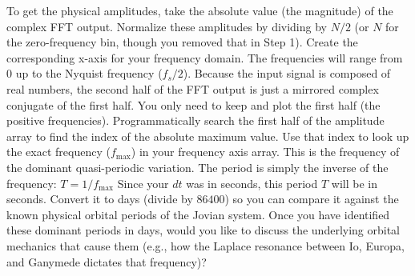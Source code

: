 {}\markdownRendererUlBegin
\markdownRendererUlItem To get the physical amplitudes, take the absolute value (the magnitude) of the complex FFT output.\markdownRendererUlItemEnd 
\markdownRendererUlItem Normalize these amplitudes by dividing by $N/2$ (or $N$ for the zero-frequency bin, though you removed that in Step 1).\markdownRendererUlItemEnd 
\markdownRendererUlEnd \markdownRendererInterblockSeparator
{}
\markdownRendererSectionEnd \markdownRendererSectionBegin
{}\markdownRendererInterblockSeparator
{}Create the corresponding x-axis for your frequency domain.\markdownRendererInterblockSeparator
{}\markdownRendererUlBegin
\markdownRendererUlItem The frequencies will range from $0$ up to the Nyquist frequency ($f_s / 2$).\markdownRendererUlItemEnd 
\markdownRendererUlItem Because the input signal is composed of real numbers, the second half of the FFT output is just a mirrored complex conjugate of the first half. You only need to keep and plot the first half (the positive frequencies).\markdownRendererUlItemEnd 
\markdownRendererUlEnd \markdownRendererInterblockSeparator
{}
\markdownRendererSectionEnd \markdownRendererSectionBegin
{}\markdownRendererInterblockSeparator
{}Programmatically search the first half of the amplitude array to find the index of the absolute maximum value. Use that index to look up the exact frequency ($f_{\text{max}}$) in your frequency axis array. This is the frequency of the dominant quasi-periodic variation.\markdownRendererInterblockSeparator
{}
\markdownRendererSectionEnd \markdownRendererSectionBegin
{}\markdownRendererInterblockSeparator
{}The period is simply the inverse of the frequency:\markdownRendererInterblockSeparator
{}\markdownRendererUlBegin
\markdownRendererUlItem $T = 1 / f_{\text{max}}$\markdownRendererUlItemEnd 
\markdownRendererUlItem Since your $dt$ was in seconds, this period $T$ will be in seconds. Convert it to days (divide by $86400$) so you can compare it against the known physical orbital periods of the Jovian system.\markdownRendererUlItemEnd 
\markdownRendererUlEnd \markdownRendererInterblockSeparator
{}\markdownRendererThematicBreak{}\markdownRendererInterblockSeparator
{}Once you have identified these dominant periods in days, would you like to discuss the underlying orbital mechanics that cause them (e.g., how the Laplace resonance between Io, Europa, and Ganymede dictates that frequency)?\markdownRendererInterblockSeparator
